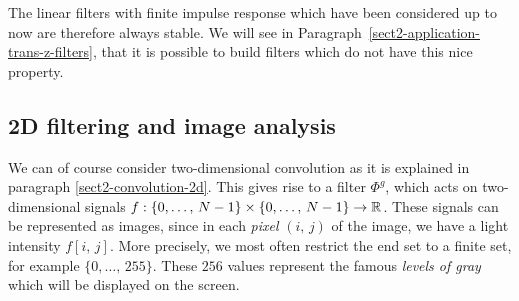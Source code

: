  
The linear filters with finite impulse response which have been considered up to now are therefore always stable. We will see in Paragraph~\ref{sect2-application-trans-z-filters}, that it is possible to build filters which do not have this nice property.
\subsection{2D filtering and image analysis}
\label{sect2-filtering-2d} 
 
 
   We can of course consider two-dimensional convolution as it is explained in paragraph \ref{sect2-convolution-2d}. This gives rise to a filter $ \Phi^g $, which acts on two-dimensional signals $ f: \{0, \ldots, \, N-1 \} \times \{0, \ldots, \, N-1 \} \rightarrow \mathbb{R} $. These signals can be represented as images, since in each \textit{pixel} $ (i, \, j) $ of the image, we have a light intensity $ f [i, \, j] $. More precisely, we most often restrict the end set to a finite set, for example $ \{0, \ldots, \, 255 \} $. These $ 256 $ values represent the famous \textit{levels of gray} which will be displayed on the screen.
 
